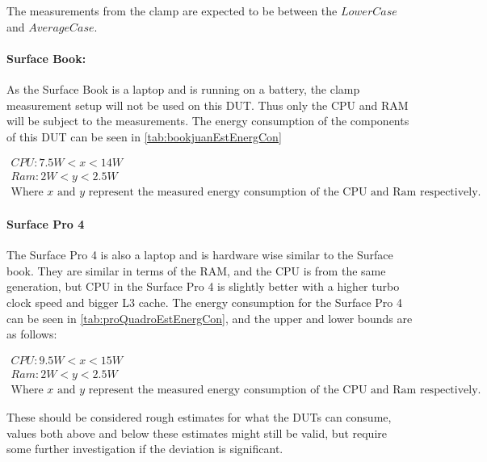 The measurements from the clamp are expected to be between the $LowerCase$ and $AverageCase$.

\paragraph{Surface Book:} As the Surface Book is a laptop and is running on a battery, the clamp measurement setup will not be used on this DUT. Thus only the CPU and RAM will be subject to the measurements. The energy consumption of the components of this DUT can be seen in \cref{tab:bookjuanEstEnergCon}

\begin{gather*}
    CPU: 7.5W < x < 14W \\
    Ram: 2W < y < 2.5W \\
    \text{Where $x$ and $y$ represent the measured energy consumption of the CPU and Ram respectively.}
\end{gather*}




\paragraph{Surface Pro 4} The Surface Pro 4 is also a laptop and is hardware wise similar to the Surface book. They are similar in terms of the RAM, and the CPU is from the same generation, but CPU in the Surface Pro 4 is slightly better with a higher turbo clock speed and bigger L3 cache. The energy consumption for the Surface Pro 4 can be seen in \cref{tab:proQuadroEstEnergCon}, and the upper and lower bounds are as follows:

\begin{gather*}
    CPU: 9.5W < x < 15W \\
    Ram: 2W < y < 2.5W \\
    \text{Where $x$ and $y$ represent the measured energy consumption of the CPU and Ram respectively.}
\end{gather*}



These should be considered rough estimates for what the DUTs can consume, values both above and below these estimates might still be valid, but require some further investigation if the deviation is significant.